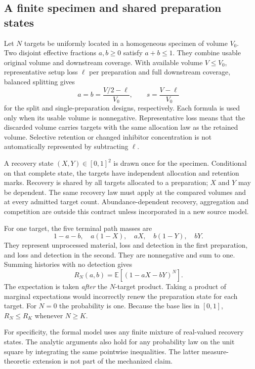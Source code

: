 \documentclass[11pt]{article}
\theoremstyle{remark}\newtheorem{remark}[theorem]{Remark}
\newcommand{\E}{\mathbb E}
\begin{document}
\subsection{A finite specimen and shared preparation states}
Let $N$ targets be uniformly located in a homogeneous specimen of volume $V_0$.
Two disjoint effective fractions $a,b\ge0$ satisfy $a+b\le1$. They combine usable
original volume and downstream coverage. With available volume $V\le V_0$,
representative setup loss $\ell$ per preparation and full downstream coverage,
balanced splitting gives
\begin{equation}\label{eq:volumes}
a=b=\frac{V/2-\ell}{V_0},\qquad
s=\frac{V-\ell}{V_0}
\end{equation}
for the split and single-preparation designs, respectively. Each formula is used
only when its usable volume is nonnegative. Representative loss means that the
discarded volume carries targets with the same allocation law as the retained
volume. Selective retention or changed inhibitor concentration is not
automatically represented by subtracting $\ell$.

A recovery state $(X,Y)\in[0,1]^2$ is drawn once for the specimen. Conditional on
that complete state, the targets have independent allocation and retention marks.
Recovery is shared by all targets allocated to a preparation; $X$ and $Y$ may be
dependent. The same recovery law must apply at the compared volumes and at every
admitted target count. Abundance-dependent recovery, aggregation and competition
are outside this contract unless incorporated in a new source model.

For one target, the five terminal path masses are
\begin{equation}\label{eq:paths}
1-a-b,\quad a(1-X),\quad aX,\quad b(1-Y),\quad bY.
\end{equation}
They represent unprocessed material, loss and detection in the first preparation,
and loss and detection in the second. They are nonnegative and sum to one.
Summing histories with no detection gives
\begin{equation}\label{eq:source}
R_N(a,b)=\E[(1-aX-bY)^N].
\end{equation}
The expectation is taken \emph{after} the $N$-target product. Taking a product of
marginal expectations would incorrectly renew the preparation state for each
target. For $N=0$ the probability is one. Because the base lies in $[0,1]$,
$R_N\le R_K$ whenever $N\ge K$.

For specificity, the formal model uses any finite mixture of real-valued recovery
states. The analytic arguments also hold for any probability law on the unit
square by integrating the same pointwise inequalities. The latter
measure-theoretic extension is not part of the mechanized claim.
\end{document}
